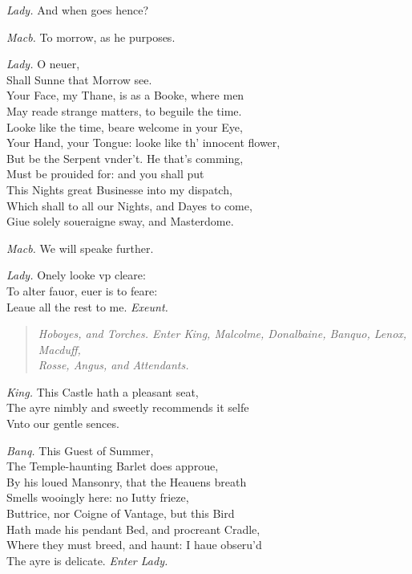 \documentclass[12pt]{sides}
\newcommand{\StageDir}[1]{\begin{quote}\centering\em #1\end{quote}}
\newcommand{\clStageDir}[1]{\hspace*{\fill}\textit{#1}\hspace*{\fill}}
\newcommand{\dia}[1]{\hskip 15pt\textit{#1}\hskip 6pt}
\begin{document}
\begin{multicols}{2}
            \dia{Lady.} And when goes hence?

            \dia{Macb.} To morrow, as he purposes.

            \dia{Lady.} O neuer, \\ Shall Sunne that Morrow see. \\ Your Face, my Thane, is as a Booke, where men \\ May reade strange matters, to beguile the time. \\ Looke like the time, beare welcome in your Eye, \\ Your Hand, your Tongue: looke like th' innocent flower, \\ But be the Serpent vnder't. He that's comming, \\ Must be prouided for: and you shall put \\ This Nights great Businesse into my dispatch, \\ Which shall to all our Nights, and Dayes to come, \\ Giue solely soueraigne sway, and Masterdome.

            \dia{Macb.} We will speake further.
            
            \dia{Lady.} Onely looke vp cleare: \\ To alter fauor, euer is to feare: \\ Leaue all the rest to me. \hspace{32pt} \textit{Exeunt.}
            \StageDir{Hoboyes, and Torches. Enter King, Malcolme, Donalbaine, Banquo, Lenox, Macduff, \\Rosse, Angus, and Attendants.}

            \dia{King.} This Castle hath a pleasant seat, \\ The ayre nimbly and sweetly recommends it selfe \\ Vnto our gentle sences.

            \dia{Banq.} This Guest of Summer, \\ The Temple-haunting Barlet does approue, \\ By his loued Mansonry, that the Heauens breath \\ Smells wooingly here: no Iutty frieze, \\ Buttrice, nor Coigne of Vantage, but this Bird \\ Hath made his pendant Bed, and procreant Cradle, \\ Where they must breed, and haunt: I haue obseru'd \\ The ayre is delicate. \clStageDir{Enter Lady.}


\end{multicols}
\end{document}
